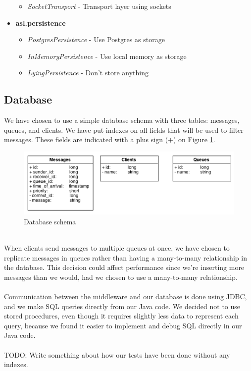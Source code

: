 \documentclass{article}
\begin{document}
\begin{itemize}
\begin{itemize}
                    \item \textit{SocketTransport} - Transport layer using sockets
                \end{itemize}
                \item \textbf{asl.persistence}
                \begin{itemize}
                    \item \textit{PostgresPersistence} - Use Postgres as storage
                    \item \textit{InMemoryPersistence} - Use local memory as storage
                    \item \textit{LyingPersistence} - Don't store anything
                \end{itemize}
            \end{itemize}

        \subsection{Database}
            We have chosen to use a simple database schema with three tables: messages, queues, and clients. We have put indexes on all fields that will be used to filter messages. These fields are indicated with a plus sign ($+$) on Figure \ref{fig:database_schema}. 
            \begin{figure}[H]
                \centering
                \includegraphics[scale=0.50]{database_schema}
                \caption{Database schema}
                \label{fig:database_schema}
            \end{figure}
            ~\\
            When clients send messages to multiple queues at once, we have chosen to replicate messages in queues rather than having a many-to-many relationship in the database. This decision could affect performance since we're inserting more messages than we would, had we chosen to use a many-to-many relationship.\\
            \\
            Communication between the middleware and our database is done using JDBC, and we make SQL queries directly from our Java code. We decided not to use stored procedures, even though it requires slightly less data to represent each query, because we found it easier to implement and debug SQL directly in our Java code.\\
            \\
            TODO: Write something about how our tests have been done without any indexes.
\end{document}
